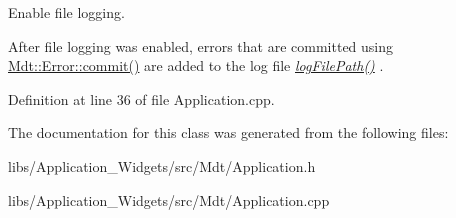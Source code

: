 Enable file logging. 

After file logging was enabled, errors that are committed using \hyperlink{class_mdt_1_1_error_a1b4a57bd4177d2985abd62b6b49a43f8}{Mdt\+::\+Error\+::commit()} are added to the log file {\itshape \hyperlink{class_mdt_1_1_application_a8531dd25ea6a6dba62f1bcaea89723a7}{log\+File\+Path()}} . 

Definition at line 36 of file Application.\+cpp.



The documentation for this class was generated from the following files\+:\begin{DoxyCompactItemize}
\item 
libs/\+Application\+\_\+\+Widgets/src/\+Mdt/Application.\+h\item 
libs/\+Application\+\_\+\+Widgets/src/\+Mdt/Application.\+cpp\end{DoxyCompactItemize}
